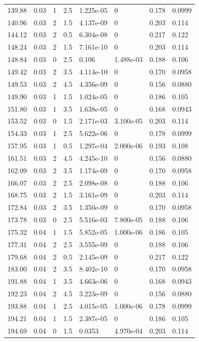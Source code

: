\documentclass[preview]{standalone}
\begin{document}
{{{\begin{tabular}{L{1.2cm}C{1.2cm} C{0.3cm}C{0.5cm} C{1.4cm}C{1.4cm} C{1.4cm}C{1.4cm}}
  139.88  &  0.03  & 1     & 2.5 &  1.225e-05  & 0  & 0.178 &  0.0999   \\ 
  140.96  &  0.03  & 2     & 1.5 &  4.137e-09  & 0  & 0.203 &  0.114   \\ 
  144.12  &  0.03  & 2     & 0.5 &  6.304e-08  & 0  & 0.217 &  0.122   \\ 
  148.24  &  0.03  & 2     & 1.5 &  7.161e-10  & 0  & 0.203 &  0.114   \\ 
  148.84  &  0.03  & 0     & 2.5 &  0.106  & 1.488e-03  & 0.188 &  0.106   \\ 
  149.42  &  0.03  & 2     & 3.5 &  4.114e-10  & 0  & 0.170 &  0.0958   \\ 
  149.53  &  0.03  & 2     & 4.5 &  4.356e-09  & 0  & 0.156 &  0.0880   \\ 
  149.90  &  0.03  & 1     & 1.5 &  1.024e-05  & 0  & 0.186 &  0.105   \\ 
  151.80  &  0.03  & 1     & 3.5 &  1.638e-05  & 0  & 0.168 &  0.0943   \\ 
  153.52  &  0.03  & 0     & 1.5 &  2.171e-03  & 3.100e-05  & 0.203 &  0.114   \\ 
  154.33  &  0.03  & 1     & 2.5 &  5.622e-06  & 0  & 0.178 &  0.0999   \\ 
  157.95  &  0.03  & 1     & 0.5 &  1.297e-04  & 2.000e-06  & 0.193 &  0.108   \\ 
  161.51  &  0.03  & 2     & 4.5 &  4.245e-10  & 0  & 0.156 &  0.0880   \\ 
  162.09  &  0.03  & 2     & 3.5 &  1.174e-09  & 0  & 0.170 &  0.0958   \\ 
  166.07  &  0.03  & 2     & 2.5 &  2.098e-08  & 0  & 0.188 &  0.106   \\ 
  168.75  &  0.03  & 2     & 1.5 &  3.161e-09  & 0  & 0.203 &  0.114   \\ 
  172.84  &  0.03  & 2     & 3.5 &  1.350e-09  & 0  & 0.170 &  0.0958   \\ 
  173.78  &  0.03  & 0     & 2.5 &  5.516e-03  & 7.800e-05  & 0.188 &  0.106   \\ 
  175.32  &  0.04  & 1     & 1.5 &  5.852e-05  & 1.000e-06  & 0.186 &  0.105   \\ 
  177.31  &  0.04  & 2     & 2.5 &  3.555e-09  & 0  & 0.188 &  0.106   \\ 
  179.68  &  0.04  & 2     & 0.5 &  2.145e-09  & 0  & 0.217 &  0.122   \\ 
  183.00  &  0.04  & 2     & 3.5 &  8.402e-10  & 0  & 0.170 &  0.0958   \\ 
  191.88  &  0.04  & 1     & 3.5 &  4.663e-06  & 0  & 0.168 &  0.0943   \\ 
  192.23  &  0.04  & 2     & 4.5 &  3.223e-09  & 0  & 0.156 &  0.0880   \\ 
  193.88  &  0.04  & 1     & 2.5 &  4.015e-05  & 1.000e-06  & 0.178 &  0.0999   \\ 
  194.21  &  0.04  & 1     & 1.5 &  2.387e-05  & 0  & 0.186 &  0.105   \\ 
  194.69  &  0.04  & 0     & 1.5 &  0.0353  & 4.970e-04  & 0.203 &  0.114   \\ 
\hline 
\end{tabular} 

}}}
\end{document}
